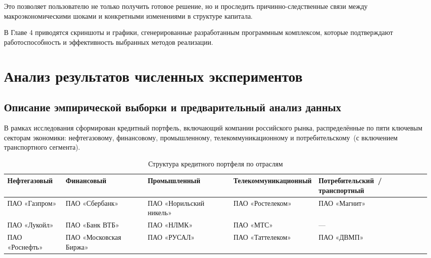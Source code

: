\documentclass[]{article}
\begin{document}
	Это позволяет пользователю не только получить готовое решение, но и проследить
	причинно-следственные связи между макроэкономическими шоками и конкретными изменениями в структуре капитала.

	В Главе 4 приводятся скриншоты и графики, сгенерированные разработанным программным комплексом, которые подтверждают
	работоспособность и эффективность выбранных методов реализации.

	\newpage
	\section{Анализ результатов численных экспериментов}

	\subsection{Описание эмпирической выборки и предварительный анализ данных}
	В рамках исследования сформирован кредитный портфель, включающий компании российского рынка, распределённые по пяти
	ключевым секторам экономики: нефтегазовому, финансовому, промышленному, телекоммуникационному и потребительскому~(с
	включением транспортного сегмента).

	\begin{table}[ht]
		\centering
		\caption{Структура кредитного портфеля по отраслям}
		\label{tab:portfolio}
		\scriptsize
		\setlength{\tabcolsep}{4pt}
		\renewcommand{\arraystretch}{1.15}
		\begin{tabularx}{\textwidth}{XXXXX}
			\toprule
			\textbf{Нефтегазовый} & \textbf{Финансовый} & \textbf{Промышленный} & \textbf{Телекоммуни\-кационный} & \textbf{Потребительский~/ транспортный} \\
			\midrule
			ПАО \newline «Газпром»  & ПАО \newline «Сбербанк»         & ПАО \newline «Норильский никель» & ПАО \newline «Ростелеком» & ПАО \newline «Магнит» \\
			ПАО \newline «Лукойл»   & ПАО \newline «Банк ВТБ»         & ПАО \newline «НЛМК»              & ПАО \newline «МТС»        & ---                   \\
			ПАО \newline «Роснефть» & ПАО \newline «Московская Биржа» & ПАО \newline «РУСАЛ»             & ПАО \newline «Таттелеком» & ПАО \newline «ДВМП»   \\
			\bottomrule
		\end{tabularx}
	\end{table}
\end{document}
